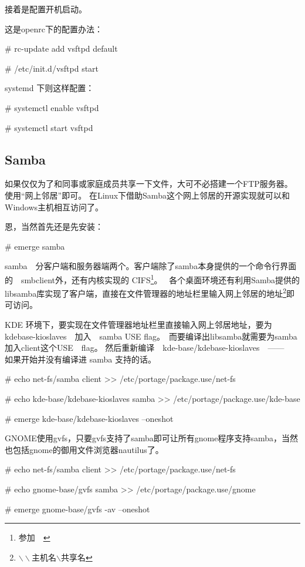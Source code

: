 接着是配置开机启动。

这是openrc下的配置办法：
\begin{code}
\# rc-update add vsftpd default

\# /etc/init.d/vsftpd start
\end{code}

systemd 下则这样配置：
\begin{code}
\# systemctl enable vsftpd

\# systemctl start vsftpd
\end{code}

\subsection{Samba}

如果仅仅为了和同事或家庭成员共享一下文件，大可不必搭建一个FTP服务器。使用“网上邻居”即可。
在Linux下借助Samba这个网上邻居的开源实现就可以和Windows主机相互访问了。

恩，当然首先还是先安装：
\begin{code}
\# emerge samba
\end{code}

samba　分客户端和服务器端两个。客户端除了samba本身提供的一个命令行界面的　smbclient外，还有内核实现的 CIFS\footnote{参加　}。　
各个桌面环境还有利用Samba提供的libsamba库实现了客户端，直接在文件管理器的地址栏里输入网上邻居的地址\footnote{$\backslash\backslash$主机名$\backslash$共享名 }即可访问。

KDE 环境下，要实现在文件管理器地址栏里直接输入网上邻居地址，要为　kdebase-kioslaves　加入　samba USE flag。　而要编译出libsamba就需要为samba加入client这个USE　flag。
然后重新编译　kde-base/kdebase-kioslaves　——　如果开始并没有编译进 samba 支持的话。
\begin{code}
\# echo net-fs/samba client >> /etc/portage/package.use/net-fs

\# echo kde-base/kdebase-kioslaves samba >> /etc/portage/package.use/kde-base

\# emerge kde-base/kdebase-kioslaves --oneshot

\end{code}

GNOME使用gvfs，只要gvfs支持了samba即可让所有gnome程序支持samba，当然也包括gnome的御用文件浏览器nautilus了。

\begin{code}
\# echo net-fs/samba client >> /etc/portage/package.use/net-fs

\# echo gnome-base/gvfs samba >> /etc/portage/package.use/gnome

\# emerge gnome-base/gvfs -av --oneshot
\end{code}

